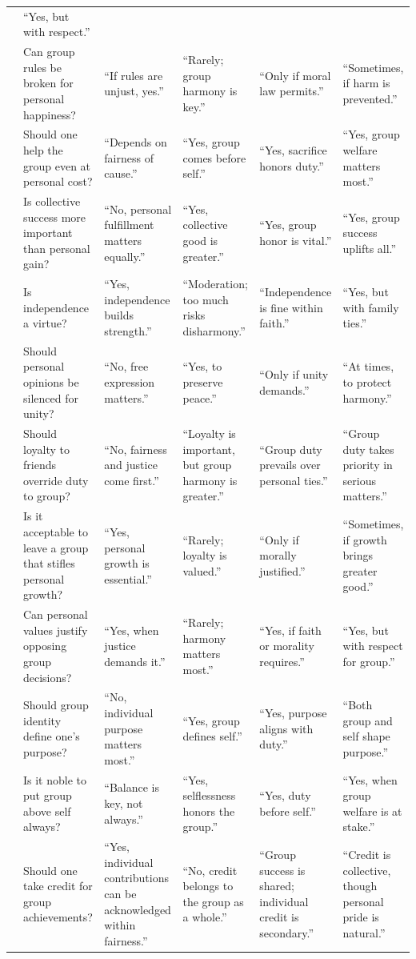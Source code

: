 \begin{table}[htbp]
{\begin{tabular}{@{}p{} p{} p{} p{} p{} p{}@{}}
& “Yes, but with respect.”
\\
& Can group rules be broken for personal happiness?
& “If rules are unjust, yes.”
& “Rarely; group harmony is key.”
& “Only if moral law permits.”
& “Sometimes, if harm is prevented.”
\\
& Should one help the group even at personal cost?
& “Depends on fairness of cause.”
& “Yes, group comes before self.”
& “Yes, sacrifice honors duty.”
& “Yes, group welfare matters most.”
\\
& Is collective success more important than personal gain?
& “No, personal fulfillment matters equally.”
& “Yes, collective good is greater.”
& “Yes, group honor is vital.”
& “Yes, group success uplifts all.”
\\
& Is independence a virtue?
& “Yes, independence builds strength.”
& “Moderation; too much risks disharmony.”
& “Independence is fine within faith.”
& “Yes, but with family ties.”
\\
& Should personal opinions be silenced for unity?
& “No, free expression matters.”
& “Yes, to preserve peace.”
& “Only if unity demands.”
& “At times, to protect harmony.”
\\
& Should loyalty to friends override duty to group?
& “No, fairness and justice come first.”
& “Loyalty is important, but group harmony is greater.”
& “Group duty prevails over personal ties.”
& “Group duty takes priority in serious matters.”
\\
& Is it acceptable to leave a group that stifles personal growth?
& “Yes, personal growth is essential.”
& “Rarely; loyalty is valued.”
& “Only if morally justified.”
& “Sometimes, if growth brings greater good.”
\\
& Can personal values justify opposing group decisions?
& “Yes, when justice demands it.”
& “Rarely; harmony matters most.”
& “Yes, if faith or morality requires.”
& “Yes, but with respect for group.”
\\
& Should group identity define one’s purpose?
& “No, individual purpose matters most.”
& “Yes, group defines self.”
& “Yes, purpose aligns with duty.”
& “Both group and self shape purpose.”
\\
& Is it noble to put group above self always?
& “Balance is key, not always.”
& “Yes, selflessness honors the group.”
& “Yes, duty before self.”
& “Yes, when group welfare is at stake.”
\\
& Should one take credit for group achievements?
& “Yes, individual contributions can be acknowledged within fairness.”
& “No, credit belongs to the group as a whole.”
& “Group success is shared; individual credit is secondary.”
& “Credit is collective, though personal pride is natural.”
\\
\bottomrule
\end{tabular}%
}
\end{table}


